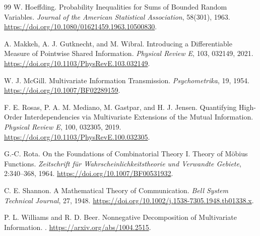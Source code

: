 \documentclass[11pt]{article}
\theoremstyle{definition}
\begin{document}
\begin{thebibliography}{99}
W. Hoeffding.
\newblock Probability Inequalities for Sums of Bounded Random Variables.
\newblock \emph{Journal of the American Statistical Association}, 58(301), 1963.
\newblock \url{https://doi.org/10.1080/01621459.1963.10500830}.

A. Makkeh, A. J. Gutknecht, and M. Wibral.
\newblock Introducing a Differentiable Measure of Pointwise Shared Information.
\newblock \emph{Physical Review E}, 103, 032149, 2021.
\newblock \url{https://doi.org/10.1103/PhysRevE.103.032149}.

W. J. McGill.
\newblock Multivariate Information Transmission.
\newblock \emph{Psychometrika}, 19, 1954.
\newblock \url{https://doi.org/10.1007/BF02289159}.

F. E. Rosas, P. A. M. Mediano, M. Gastpar, and H. J. Jensen.
\newblock Quantifying High-Order Interdependencies via Multivariate Extensions of the Mutual
Information.
\newblock \emph{Physical Review E}, 100, 032305, 2019.
\newblock \url{https://doi.org/10.1103/PhysRevE.100.032305}.

G.-C. Rota.
\newblock On the Foundations of Combinatorial Theory I. Theory of M{\"o}bius Functions.
\newblock \emph{Zeitschrift f{\"u}r Wahrscheinlichkeitstheorie und Verwandte Gebiete},
2:340--368, 1964.
\newblock \url{https://doi.org/10.1007/BF00531932}.

C. E. Shannon.
\newblock A Mathematical Theory of Communication.
\newblock \emph{Bell System Technical Journal}, 27, 1948.
\newblock \url{https://doi.org/10.1002/j.1538-7305.1948.tb01338.x}.

P. L. Williams and R. D. Beer.
\newblock Nonnegative Decomposition of Multivariate Information.
.
\newblock \url{https://arxiv.org/abs/1004.2515}.

\end{thebibliography}
\endgroup
\end{document}
